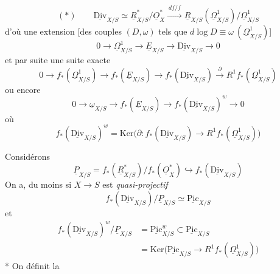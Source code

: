 \documentclass[11pt,a4paper]{article}
\begin{document}
\[
(*)\qquad \underline{\mathrm{Div}}_{X/S} \simeq \underline{R}^{*}_{X/S} / \underline{O}^{*}_{X} \xrightarrow{\ df/f\ } \underline{R}_{X/S}(\underline{\Omega}^{1}_{X/S}) / \underline{\Omega}^{1}_{X/S}
\]
\struck{\ill{}} d'où une extension [des couples $(D, \omega)$ tels que $d\log D \equiv \omega \ (\underline{\Omega}^{1}_{X/S})$]
\[
0 \to \underline{\Omega}^{1}_{X/S} \to \underline{E}_{X/S} \to \underline{\mathrm{Div}}_{X/S} \to 0
\]
et par suite une suite exacte
\[
0 \to f_{*}(\underline{\Omega}^{1}_{X/S}) \to f_{*}(\underline{E}_{X/S}) \to f_{*}(\underline{\mathrm{Div}}_{X/S}) \xrightarrow{\ \partial\ } R^{1}f_{*}(\underline{\Omega}^{1}_{X/S})
\]
ou encore
\[
0 \to \underline{\omega}_{X/S} \to f_{*}(\underline{E}_{X/S}) \to f_{*}(\underline{\mathrm{Div}}_{X/S})^{w} \to 0
\]
où
\[
f_{*}(\underline{\mathrm{Div}}_{X/S})^{w} = \mathrm{Ker}\bigl(\partial\colon f_{*}(\underline{\mathrm{Div}}_{X/S}) \to R^{1}f_{*}(\underline{\Omega}^{1}_{X/S})\bigr)
\]

Considérons
\[
\underline{P}_{X/S} = f_{*}(\underline{R}^{*}_{X/S}) / f_{*}(\underline{O}^{*}_{X}) \hookrightarrow f_{*}(\underline{\mathrm{Div}}_{X/S})
\]
On a, du moins si $X \to S$ est \emph{quasi-projectif} \struck{\ill{}}
\[
f_{*}(\underline{\mathrm{Div}}_{X/S}) / \underline{P}_{X/S} \simeq \underline{\mathrm{Pic}}_{X/S}
\]
 et  
\[
\begin{aligned}
f_{*}(\underline{\mathrm{Div}}_{X/S})^{w} / \underline{P}_{X/S} &= \underline{\mathrm{Pic}}^{w}_{X/S} \subset \underline{\mathrm{Pic}}_{X/S} \\
&= \mathrm{Ker}\bigl(\underline{\mathrm{Pic}}_{X/S} \to R^{1}f_{*}(\underline{\Omega}^{1}_{X/S})\bigr)
\end{aligned}
\]
* On définit la  
\end{document}
